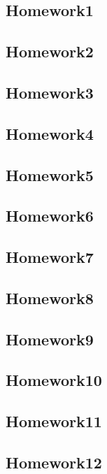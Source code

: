 \documentclass[../main.tex]{subfiles}
\begin{document}
\subsection{Homework1}

\newpage

\subsection{Homework2}

\newpage

\subsection{Homework3}

\newpage

\subsection{Homework4}

\newpage

\subsection{Homework5}

\newpage

\subsection{Homework6}

\newpage

\subsection{Homework7}

\newpage

\subsection{Homework8}

\newpage

\subsection{Homework9}

\newpage

\subsection{Homework10}

\newpage

\subsection{Homework11}

\newpage

\subsection{Homework12}

\newpage
\end{document}
